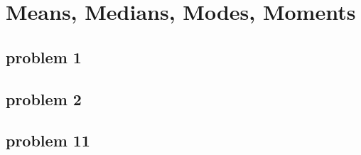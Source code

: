 \section{Means, Medians, Modes, Moments}

\subsection{problem 1}

\subsection{problem 2}





\subsection{problem 11}

